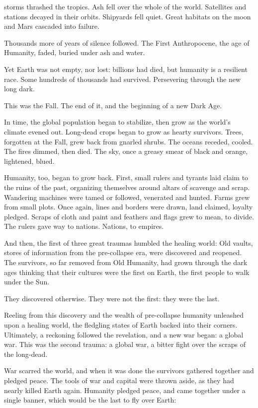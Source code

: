 storms thrashed the tropics. Ash fell over the whole of the world. Satellites and stations decayed  
in their orbits. Shipyards fell quiet. Great habitats on the moon and Mars cascaded into failure.  
 

Thousands more of years of silence followed. The First Anthropocene, the age of Humanity,  
faded, buried under ash and water. 
 

Yet Earth was not empty, nor lost: billions had died, but humanity is a resilient race. Some  
hundreds of thousands had survived. Persevering through the new long dark. 
 

This was the Fall. The end of it, and the beginning of a new Dark Age. 
 

In time, the global population began to stabilize, then grow as the world’s climate evened out.  
Long-dead crops began to grow as hearty survivors. Trees, forgotten at the Fall, grew back from  
gnarled shrubs. The oceans receded, cooled. The fires dimmed, then died. The sky, once a  
greasy smear of black and orange, lightened, blued.   
 

Humanity, too, began to grow back. First, small rulers and tyrants laid claim to the ruins of the  
past, organizing themselves around altars of scavenge and scrap. Wandering machines were  
tamed or followed, venerated and hunted. Farms grew from small plots. Once again, lines and  
borders were drawn, land claimed, loyalty pledged. Scraps of cloth and paint and feathers and  
flags grew to mean, to divide. The rulers gave way to nations. Nations, to empires. 
 

And then, the first of three great traumas humbled the healing world: Old vaults, stores of  
information from the pre-collapse era, were discovered and reopened. The survivors, so far  
removed from Old Humanity, had grown through the dark ages thinking that their cultures were  
the first on Earth, the first people to walk under the Sun. 
 

They discovered otherwise. They were not the first: they were the last. 
 

Reeling from this discovery and the wealth of pre-collapse humanity unleashed upon a healing  
world, the fledgling states of Earth backed into their corners. Ultimately, a reckoning followed the  
revelation, and a new war began: a global war. This was the second trauma: a global war, a bitter  
fight over the scraps of the long-dead. 
 

War scarred the world, and when it was done the survivors gathered together and pledged  
peace. The tools of war and capital were thrown aside, as they had nearly killed Earth again.  
Humanity pledged peace, and came together under a single banner, which would be the last to  
fly over Earth: 
 

